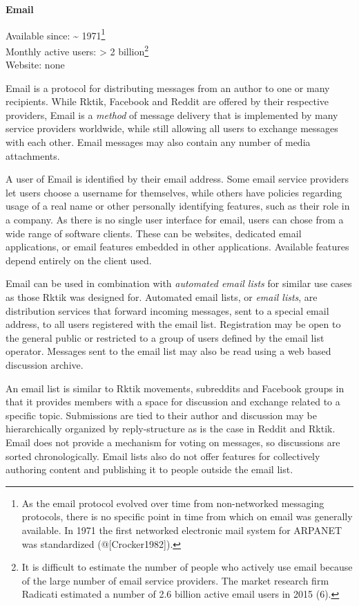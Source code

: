 \textbf{Email}

Available since: \textasciitilde{} 1971\footnote{As the email protocol
  evolved over time from non-networked messaging protocols, there is no
  specific point in time from which on email was generally available. In
  1971 the first networked electronic mail system for ARPANET was
  standardized (@{[}Crocker1982{]}).}\\
Monthly active users: \textgreater{} 2 billion\footnote{It is difficult
  to estimate the number of people who actively use email because of the
  large number of email service providers. The market research firm
  Radicati estimated a number of 2.6 billion active email users in 2015
  (6).}\\
Website: none

Email is a protocol for distributing messages from an author to one or
many recipients. While Rktik, Facebook and Reddit are offered by their
respective providers, Email is a \emph{method} of message delivery that
is implemented by many service providers worldwide, while still allowing
all users to exchange messages with each other. Email messages may also
contain any number of media attachments.

A user of Email is identified by their email address. Some email service
providers let users choose a username for themselves, while others have
policies regarding usage of a real name or other personally identifying
features, such as their role in a company. As there is no single user
interface for email, users can chose from a wide range of software
clients. These can be websites, dedicated email applications, or email
features embedded in other applications. Available features depend
entirely on the client used.

Email can be used in combination with \emph{automated email lists} for
similar use cases as those Rktik was designed for. Automated email
lists, or \emph{email lists}, are distribution services that forward
incoming messages, sent to a special email address, to all users
registered with the email list. Registration may be open to the general
public or restricted to a group of users defined by the email list
operator. Messages sent to the email list may also be read using a web
based discussion archive.

An email list is similar to Rktik movements, subreddits and Facebook
groups in that it provides members with a space for discussion and
exchange related to a specific topic. Submissions are tied to their
author and discussion may be hierarchically organized by reply-structure
as is the case in Reddit and Rktik. Email does not provide a mechanism
for voting on messages, so discussions are sorted chronologically. Email
lists also do not offer features for collectively authoring content and
publishing it to people outside the email list.

